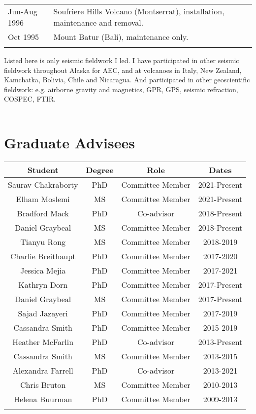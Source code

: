 \documentclass[margin,line]{res}
\begin{document}
\begin{resume}
\begin{table}[ht]
\begin{tabular}{ m{2.5cm} m{12cm} }
\hdashline
Jun-Aug 1996 & Soufriere Hills Volcano (Montserrat), installation, maintenance and removal.\\
\hdashline
Oct 1995 & Mount Batur (Bali), maintenance only.\\
\hdashline
\end{tabular}
\end{table}
Listed here is only seismic fieldwork I led. I have participated in other seismic fieldwork throughout Alaska for AEC, and at volcanoes in Italy, New Zealand, Kamchatka, Bolivia, Chile and Nicaragua. And participated in other geoscientific fieldwork: e.g. airborne gravity and magnetics, GPR, GPS, seismic refraction, COSPEC, FTIR.\\
\\
%
\section{\sc Graduate Advisees}
\hline
\begin{table}[ht]
\begin{tabular}{c c c c}
Student & Degree & Role & Dates\\
\hline
Saurav Chakraborty & PhD & Committee Member & 2021-Present\\
\hdashline
Elham Moslemi & MS & Committee Member & 2021-Present\\
\hdashline
Bradford Mack & PhD & Co-advisor & 2018-Present\\
\hdashline
Daniel Graybeal & MS & Committee Member & 2018-Present\\
\hdashline
Tianyu Rong & MS & Committee Member & 2018-2019\\
\hdashline
Charlie Breithaupt & PhD & Committee Member & 2017-2020\\
\hdashline
Jessica Mejia & PhD & Committee Member & 2017-2021\\
\hdashline
Kathryn Dorn & PhD & Committee Member & 2017-Present\\
\hdashline
Daniel Graybeal & MS & Committee Member & 2017-Present\\
\hdashline
Sajad Jazayeri & PhD & Committee Member & 2017-2019\\
\hdashline
Cassandra Smith	& PhD & Committee Member & 2015-2019\\
\hdashline
Heather McFarlin & PhD & Co-advisor & 2013-Present\\
\hdashline
Cassandra Smith	& MS & Committee Member & 2013-2015\\
\hdashline
Alexandra Farrell & PhD & Co-advisor & 2013-2021\\
\hdashline
Chris Bruton & MS & Committee Member & 2010-2013\\
\hdashline
Helena Buurman & PhD & Committee Member & 2009-2013\\
\hdashline
\end{tabular}
\label{table:nonlin}
\end{table}


\end{resume}
\end{document}
